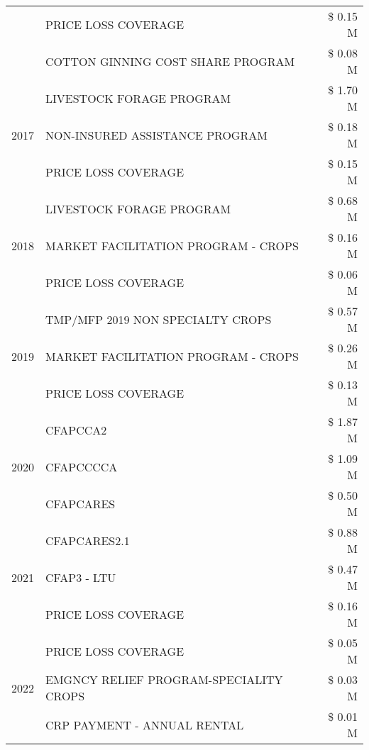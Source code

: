 \begin{tabular}{llr}
 & PRICE LOSS COVERAGE & \$ 0.15 M \\
 & COTTON GINNING COST SHARE PROGRAM & \$ 0.08 M \\
\cline{1-3}
\multirow[t]{3}{*}{2017} & LIVESTOCK FORAGE PROGRAM & \$ 1.70 M \\
 & NON-INSURED ASSISTANCE PROGRAM & \$ 0.18 M \\
 & PRICE LOSS COVERAGE & \$ 0.15 M \\
\cline{1-3}
\multirow[t]{3}{*}{2018} & LIVESTOCK FORAGE PROGRAM & \$ 0.68 M \\
 & MARKET FACILITATION PROGRAM - CROPS & \$ 0.16 M \\
 & PRICE LOSS COVERAGE & \$ 0.06 M \\
\cline{1-3}
\multirow[t]{3}{*}{2019} & TMP/MFP 2019 NON SPECIALTY CROPS & \$ 0.57 M \\
 & MARKET FACILITATION PROGRAM - CROPS & \$ 0.26 M \\
 & PRICE LOSS COVERAGE & \$ 0.13 M \\
\cline{1-3}
\multirow[t]{3}{*}{2020} & CFAPCCA2 & \$ 1.87 M \\
 & CFAPCCCCA & \$ 1.09 M \\
 & CFAPCARES & \$ 0.50 M \\
\cline{1-3}
\multirow[t]{3}{*}{2021} & CFAPCARES2.1 & \$ 0.88 M \\
 & CFAP3 - LTU & \$ 0.47 M \\
 & PRICE LOSS COVERAGE & \$ 0.16 M \\
\cline{1-3}
\multirow[t]{3}{*}{2022} & PRICE LOSS COVERAGE & \$ 0.05 M \\
 & EMGNCY RELIEF PROGRAM-SPECIALITY CROPS & \$ 0.03 M \\
 & CRP PAYMENT - ANNUAL RENTAL & \$ 0.01 M \\
\cline{1-3}
\bottomrule
\end{tabular}
